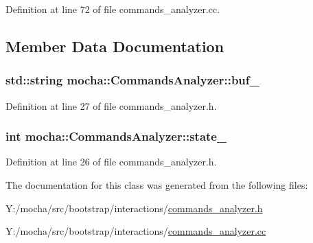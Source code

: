 Definition at line 72 of file commands\_\-analyzer.cc.



\subsection{Member Data Documentation}
\hypertarget{classmocha_1_1_commands_analyzer_afcbd08ec81044c6269b8c360e71c744e}{
\subsubsection[{buf\_\-}]{\setlength{\rightskip}{0pt plus 5cm}std::string {\bf mocha::CommandsAnalyzer::buf\_\-}}}
\label{classmocha_1_1_commands_analyzer_afcbd08ec81044c6269b8c360e71c744e}


Definition at line 27 of file commands\_\-analyzer.h.

\hypertarget{classmocha_1_1_commands_analyzer_acebf245eb9e6e813c4e29c3b486bd654}{
\subsubsection[{state\_\-}]{\setlength{\rightskip}{0pt plus 5cm}int {\bf mocha::CommandsAnalyzer::state\_\-}}}
\label{classmocha_1_1_commands_analyzer_acebf245eb9e6e813c4e29c3b486bd654}


Definition at line 26 of file commands\_\-analyzer.h.



The documentation for this class was generated from the following files:\begin{DoxyCompactItemize}
\item 
Y:/mocha/src/bootstrap/interactions/\hyperlink{commands__analyzer_8h}{commands\_\-analyzer.h}\item 
Y:/mocha/src/bootstrap/interactions/\hyperlink{commands__analyzer_8cc}{commands\_\-analyzer.cc}\end{DoxyCompactItemize}
